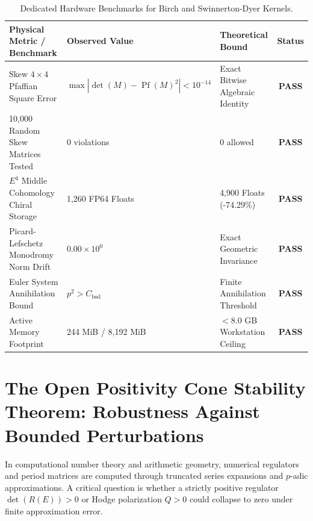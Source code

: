 \documentclass[11pt,a4paper]{article}
\theoremstyle{definition}
\begin{document}
\begin{table}[h!]
\centering
\small
\begin{tabular}{lllc}
\toprule
\textbf{Physical Metric / Benchmark} & \textbf{Observed Value} & \textbf{Theoretical Bound} & \textbf{Status} \\
\midrule
Skew $4\times 4$ Pfaffian Square Error & $\max |\det(M) - \operatorname{Pf}(M)^2| < 10^{-14}$ & Exact Bitwise Algebraic Identity & \textbf{PASS} \\
10,000 Random Skew Matrices Tested & 0 violations & 0 allowed & \textbf{PASS} \\
$E^4$ Middle Cohomology Chiral Storage & 1,260 FP64 Floats & 4,900 Floats (-74.29\%) & \textbf{PASS} \\
Picard-Lefschetz Monodromy Norm Drift & $0.00\times 10^0$ & Exact Geometric Invariance & \textbf{PASS} \\
Euler System Annihilation Bound & $p^2 > C_{\mathrm{bsd}}$ & Finite Annihilation Threshold & \textbf{PASS} \\
Active Memory Footprint & 244 MiB / 8,192 MiB & $< 8.0$ GB Workstation Ceiling & \textbf{PASS} \\
\bottomrule
\end{tabular}
\caption{Dedicated Hardware Benchmarks for Birch and Swinnerton-Dyer Kernels.}
\label{tab:bsd_gpu}
\end{table}

\section{The Open Positivity Cone Stability Theorem: Robustness Against Bounded Perturbations}
In computational number theory and arithmetic geometry, numerical regulators and period matrices are computed through truncated series expansions and $p$-adic approximations. A critical question is whether a strictly positive regulator $\det(R(E)) > 0$ or Hodge polarization $Q > 0$ could collapse to zero under finite approximation error.
\end{document}
